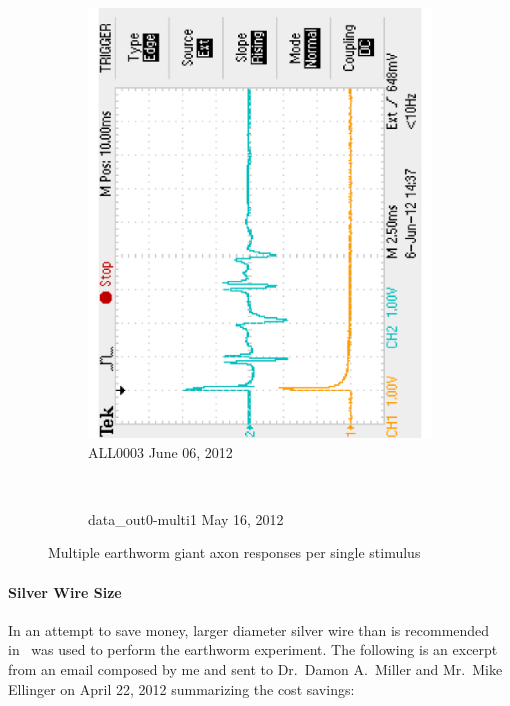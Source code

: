 \begin{figure}[H]
	\centering 
	\begin{singlespace}
	\begin{subfigure}[b]{0.48\textwidth}
		\centering 
		\includegraphics[trim=0 0.1in 0 0.1in,clip,angle=-90,width=\textwidth]{./figures/F0003TEK_multi_120606} %
	\caption{ALL0003 June 06, 2012}
	\end{subfigure}
	~
	\begin{subfigure}[b]{0.48\textwidth}
		\centering 
		\resizebox{\textwidth}{!}{}
	\caption{data\_out0-multi1 May 16, 2012}
	\end{subfigure}
	\caption{Multiple earthworm giant axon responses per single stimulus\label{fig:multi}}
	\end{singlespace}
\end{figure}

\paragraph{Silver Wire Size} In an attempt to save money, larger diameter silver wire than is recommended in~\cite{KuehJellies} was used to perform the earthworm experiment.  The following is an excerpt from an email composed by me and sent to Dr.~Damon A.~Miller and Mr.~Mike Ellinger on April 22, 2012 summarizing the cost savings:

